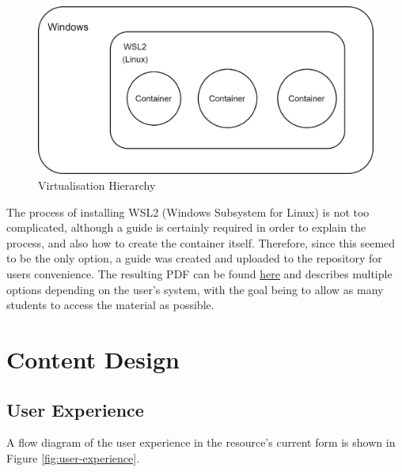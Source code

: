 \begin{figure}[h]
\centering
\includegraphics[scale=0.25]{virtualisation}
\caption{Virtualisation Hierarchy} \label{fig:virtualisation}
\end{figure}

The process of installing WSL2 (Windows Subsystem for Linux) is not too complicated, although a guide is certainly required in order to explain the process, and also how to create the container itself. Therefore, since this seemed to be the only option, a guide was created and uploaded to the repository for users convenience. The resulting PDF can be found \href{https://github.com/Crypto84/FEMLearningResources/blob/main/setupGuide.pdf}{here} and describes multiple options depending on the user's system, with the goal being to allow as many students to access the material as possible.



\section{Content Design}



\subsection{User Experience}

A flow diagram of the user experience in the resource's current form is shown in Figure \ref{fig:user-experience}.

